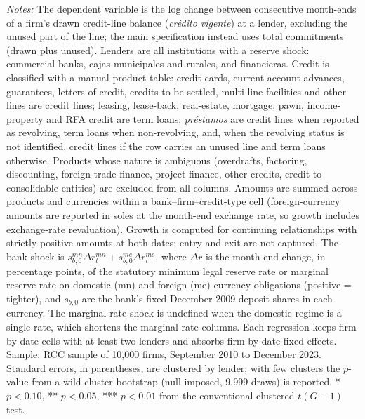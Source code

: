 \begin{table}[!h]
\begin{threeparttable}[b]
      \begin{tablenotes}\item \textit{Notes:} The dependent variable is the log change between consecutive month-ends of a firm's drawn credit-line balance (\textit{cr\'edito vigente}) at a lender, excluding the unused part of the line; the main specification instead uses total commitments (drawn plus unused). Lenders are all institutions with a reserve shock: commercial banks, cajas municipales and rurales, and financieras. Credit is classified with a manual product table: credit cards, current-account advances, guarantees, letters of credit, credits to be settled, multi-line facilities and other lines are credit lines; leasing, lease-back, real-estate, mortgage, pawn, income-property and RFA credit are term loans; \textit{pr\'estamos} are credit lines when reported as revolving, term loans when non-revolving, and, when the revolving status is not identified, credit lines if the row carries an unused line and term loans otherwise. Products whose nature is ambiguous (overdrafts, factoring, discounting, foreign-trade finance, project finance, other credits, credit to consolidable entities) are excluded from all columns. Amounts are summed across products and currencies within a bank--firm--credit-type cell (foreign-currency amounts are reported in soles at the month-end exchange rate, so growth includes exchange-rate revaluation). Growth is computed for continuing relationships with strictly positive amounts at both dates; entry and exit are not captured. The bank shock is $s^{mn}_{b,0}\Delta r^{mn}_{t}+s^{me}_{b,0}\Delta r^{me}_{t}$, where $\Delta r$ is the month-end change, in percentage points, of the statutory minimum legal reserve rate or marginal reserve rate on domestic (mn) and foreign (me) currency obligations (positive = tighter), and $s_{b,0}$ are the bank's fixed December 2009 deposit shares in each currency. The marginal-rate shock is undefined when the domestic regime is a single rate, which shortens the marginal-rate columns. Each regression keeps firm-by-date cells with at least two lenders and absorbs firm-by-date fixed effects. Sample: RCC sample of 10,000 firms, September 2010 to December 2023. Standard errors, in parentheses, are clustered by lender; with few clusters the $p$-value from a wild cluster bootstrap (null imposed, 9,999 draws) is reported. * $p<0.10$, ** $p<0.05$, *** $p<0.01$ from the conventional clustered $t(G-1)$ test.
      \end{tablenotes}
   \end{threeparttable}
\end{table}


